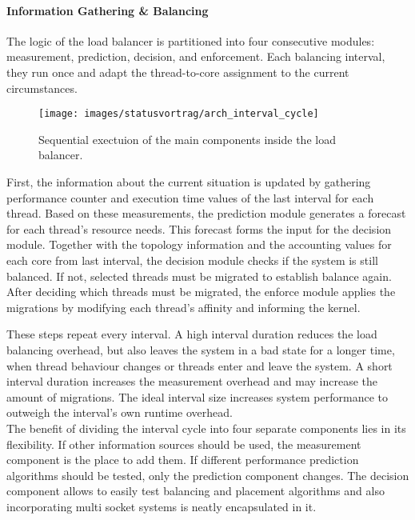 \paragraph{Information Gathering \& Balancing}
The logic of the load balancer is partitioned into four consecutive modules:
measurement, prediction, decision, and enforcement.
Each balancing interval, they run once and adapt the thread-to-core
assignment to the current circumstances.

\begin{figure}[h]
  \centering
  \texttt{[image: images/statusvortrag/arch\_interval\_cycle]}
  \caption{Sequential exectuion of the main components inside the load
  balancer.}
  \label{arch:fig:intervalcycle}
\end{figure}

First, the information about the current situation is updated by gathering
performance counter and execution time values of the last interval for each
thread.
Based on these measurements, the prediction module generates a forecast for
each thread's resource needs.
This forecast forms the input for the decision module.
Together with the topology information and the accounting values for each core
from last interval, the decision module checks if the system is still balanced.
If not, selected threads must be migrated to establish balance again.
After deciding which threads must be migrated, the enforce module applies the
migrations by modifying each thread's affinity and informing the kernel.

These steps repeat every interval. A high interval duration reduces the
load balancing overhead, but also leaves the system in a bad state for a longer
time, when thread behaviour changes or threads enter and leave the system.
A short interval duration increases the measurement overhead and may increase
the amount of migrations.
The ideal interval size increases system performance to outweigh the interval's
own runtime overhead.
\\

The benefit of dividing the interval cycle into four separate components lies
in its flexibility.
If other information sources should be used, the measurement component is the
place to add them.
If different performance prediction algorithms should be tested, only the
prediction component changes.
The decision component allows to easily test balancing and placement algorithms
and also incorporating multi socket systems is neatly encapsulated in it.

